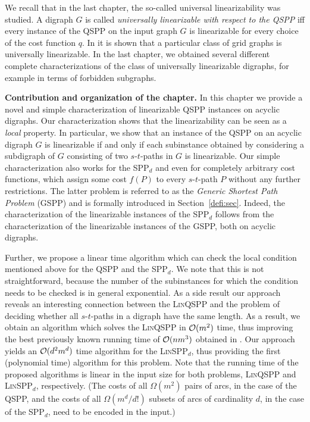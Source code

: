    We recall that in the last chapter, the  so-called universal linearizability was studied.
A digraph $G$ is called \emph{universally linearizable with respect to the
  QSPP} iff every instance of the QSPP on the input graph $G$ is linearizable for
every choice of the cost function $q$. In \cite{huSo2018} it is shown that a
particular class of grid graphs is universally linearizable. In
the last chapter, we obtained several different complete characterizations of the class of universally linearizable digraphs, for example in terms of 
forbidden subgraphs.  
\medskip

\textbf{Contribution and organization of the chapter.}
In this chapter we provide a novel and simple characterization of linearizable QSPP instances on acyclic 
digraphs.
Our characterization shows that the linearizability can be seen as a  \emph{local} property.  In particular, we show  that an instance of the QSPP on an acyclic 
digraph $G$  is linearizable if and only if each subinstance obtained by considering a subdigraph of $G$ consisting of two $s$-$t$-paths in $G$   is linearizable. Our simple characterization also works for the SPP$_d$  and even for completely arbitrary cost  functions, which  assign some cost $f(P)$ to every $s$-$t$-path $P$ without any further restrictions. The latter problem is referred to as the \emph{Generic Shortest Path Problem} (GSPP) and is formally introduced in Section~\ref{defi:sec}. Indeed, the characterization of the linearizable instances of the SPP$_d$ 
follows from the characterization of the linearizable instances of the GSPP, both on acyclic digraphs.

Further,  we propose  a 
linear time algorithm
which can check the local condition mentioned above   for the QSPP and the SPP$_d$. 
We note that this is not straightforward, because the number of the subinstances for which the condition needs to be checked is in general exponential. As a side result our approach reveals  an interesting connection between the \textsc{Lin}QSPP and the problem of deciding  whether all $s$-$t$-paths in a digraph have the same length.
As a result, we obtain an algorithm which solves the \textsc{Lin}QSPP  in $\mathcal{O}(m^2)$ time, thus improving the best previously known running time of $\mathcal{O}(nm^3)$ obtained in \cite{huSo2021}. Our approach yields an $\mathcal{O}(d^2 m^d)$ time algorithm for the \textsc{Lin}SPP$_d$, thus providing  the first (polynomial time) algorithm for this problem.  Note that the running time of the proposed algorithms is linear in the input size for both problems,  \textsc{Lin}QSPP and \textsc{Lin}SPP$_d$, respectively. 
(The costs of all $\Omega(m^2)$ pairs of arcs, in the case of the QSPP, and the  costs of all $\Omega(m^d/d!)$ subsets of  arcs of cardinality $d$, in the case of the
SPP$_d$,  need to be encoded in the input.) 


